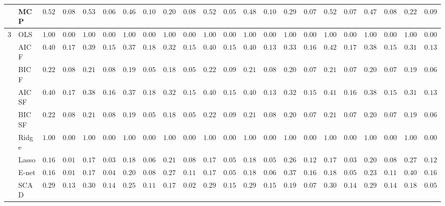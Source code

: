 \begin{tabular}{p{0.2cm}p{1cm}|p{0.6cm}p{0.6cm}|p{0.6cm}p{0.6cm}p{0.6cm}p{0.6cm}p{0.6cm}p{0.6cm}|p{0.6cm}p{0.6cm}p{0.6cm}p{0.6cm}p{0.6cm}p{0.6cm}|p{0.6cm}p{0.6cm}p{0.6cm}p{0.6cm}p{0.6cm}p{0.6cm}}
 & MCP  & $0.5250$ & $0.0833$ & $0.5333$ & $0.0670$ & $0.4650$ & $0.1093$ & $0.2033$ & $0.0806$ & $0.5200$ & $0.0594$ & $0.4850$ & $0.1088$ & $0.2950$ & $0.0744$ & $0.5217$ & $0.0773$ & $0.4783$ & $0.0875$ & $0.2233$ & $0.0954$ \\\hline
3 & OLS  & $1.0000$ & $0.0000$ & $1.0000$ & $0.0000$ & $1.0000$ & $0.0000$ & $1.0000$ & $0.0000$ & $1.0000$ & $0.0000$ & $1.0000$ & $0.0000$ & $1.0000$ & $0.0000$ & $1.0000$ & $0.0000$ & $1.0000$ & $0.0000$ & $1.0000$ & $0.0000$ \\
 & AIC F  & $0.4083$ & $0.1714$ & $0.3917$ & $0.1596$ & $0.3700$ & $0.1813$ & $0.3250$ & $0.1505$ & $0.4050$ & $0.1594$ & $0.4083$ & $0.1389$ & $0.3317$ & $0.1650$ & $0.4200$ & $0.1700$ & $0.3800$ & $0.1573$ & $0.3133$ & $0.1387$ \\
 & BIC F  & $0.2267$ & $0.0871$ & $0.2183$ & $0.0877$ & $0.1900$ & $0.0581$ & $0.1850$ & $0.0524$ & $0.2200$ & $0.0944$ & $0.2183$ & $0.0810$ & $0.2083$ & $0.0799$ & $0.2133$ & $0.0789$ & $0.2067$ & $0.0790$ & $0.1983$ & $0.0657$ \\
 & AIC SF  & $0.4083$ & $0.1714$ & $0.3883$ & $0.1608$ & $0.3700$ & $0.1813$ & $0.3250$ & $0.1505$ & $0.4017$ & $0.1573$ & $0.4083$ & $0.1389$ & $0.3200$ & $0.1529$ & $0.4167$ & $0.1667$ & $0.3800$ & $0.1591$ & $0.3117$ & $0.1395$ \\
 & BIC SF  & $0.2267$ & $0.0871$ & $0.2183$ & $0.0877$ & $0.1900$ & $0.0581$ & $0.1850$ & $0.0524$ & $0.2200$ & $0.0944$ & $0.2183$ & $0.0810$ & $0.2083$ & $0.0799$ & $0.2133$ & $0.0789$ & $0.2067$ & $0.0790$ & $0.1983$ & $0.0657$ \\
 & Ridge  & $1.0000$ & $0.0000$ & $1.0000$ & $0.0000$ & $1.0000$ & $0.0000$ & $1.0000$ & $0.0000$ & $1.0000$ & $0.0000$ & $1.0000$ & $0.0000$ & $1.0000$ & $0.0000$ & $1.0000$ & $0.0000$ & $1.0000$ & $0.0000$ & $1.0000$ & $0.0000$ \\
 & Lasso  & $0.1683$ & $0.0167$ & $0.1717$ & $0.0371$ & $0.1883$ & $0.0697$ & $0.2183$ & $0.0844$ & $0.1767$ & $0.0571$ & $0.1800$ & $0.0512$ & $0.2683$ & $0.1273$ & $0.1767$ & $0.0398$ & $0.2033$ & $0.0873$ & $0.2717$ & $0.1223$ \\
 & E-net  & $0.1683$ & $0.0167$ & $0.1783$ & $0.0489$ & $0.2050$ & $0.0882$ & $0.2733$ & $0.1197$ & $0.1783$ & $0.0592$ & $0.1883$ & $0.0611$ & $0.3700$ & $0.1668$ & $0.1833$ & $0.0556$ & $0.2317$ & $0.1108$ & $0.4067$ & $0.1647$ \\
 & SCAD  & $0.2933$ & $0.1300$ & $0.3050$ & $0.1403$ & $0.2550$ & $0.1195$ & $0.1717$ & $0.0286$ & $0.2917$ & $0.1560$ & $0.2917$ & $0.1505$ & $0.1933$ & $0.0776$ & $0.3017$ & $0.1415$ & $0.2950$ & $0.1438$ & $0.1850$ & $0.0524$ \\

\end{tabular}
